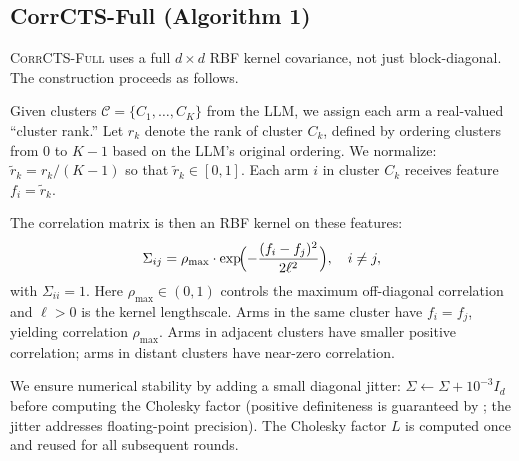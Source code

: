 \documentclass{article}
\theoremstyle{plain}
\theoremstyle{definition}
\theoremstyle{remark}
\newcommand{\CorrFull}{\textsc{CorrCTS-Full}}
\begin{document}
\subsection{CorrCTS-Full (Algorithm 1)}\label{sec:n1}

\CorrFull{} uses a full $d \times d$ RBF kernel covariance, not just block-diagonal.
The construction proceeds as follows.

Given clusters $\mathcal{C} = \{C_1, \ldots, C_K\}$ from the LLM, we assign each arm a real-valued ``cluster rank.''
Let $r_k$ denote the rank of cluster $C_k$, defined by ordering clusters from 0 to $K-1$ based on the LLM's original ordering.
We normalize: $\tilde{r}_k = r_k / (K-1)$ so that $\tilde{r}_k \in [0,1]$.
Each arm $i$ in cluster $C_k$ receives feature $f_i = \tilde{r}_k$.

The correlation matrix is then an RBF kernel on these features:
\begin{equation}\label{eq:rbf}
  \Sigma_{ij} = \rho_{\max} \cdot \exp\!\Bigl(-\frac{(f_i - f_j)^2}{2\ell^2}\Bigr), \quad i \neq j,
\end{equation}
with $\Sigma_{ii} = 1$.
Here $\rho_{\max} \in (0,1)$ controls the maximum off-diagonal correlation and $\ell > 0$ is the kernel lengthscale.
Arms in the same cluster have $f_i = f_j$, yielding correlation $\rho_{\max}$.
Arms in adjacent clusters have smaller positive correlation; arms in distant clusters have near-zero correlation.

We ensure numerical stability by adding a small diagonal jitter: $\Sigma \leftarrow \Sigma + 10^{-3} I_d$ before computing the Cholesky factor (positive definiteness is guaranteed by ; the jitter addresses floating-point precision).
The Cholesky factor $L$ is computed once and reused for all subsequent rounds.
\end{document}
